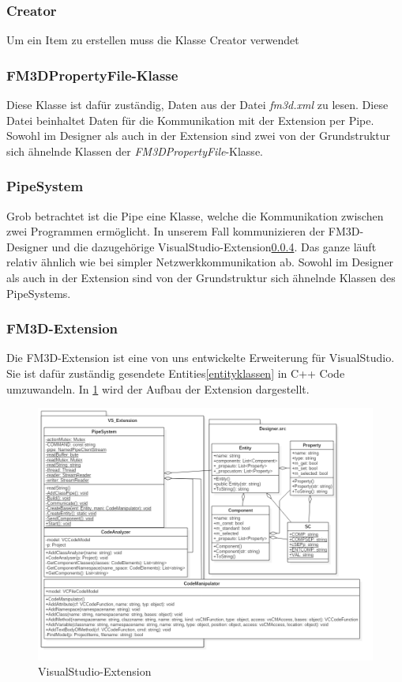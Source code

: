 \subsubsection{Creator}
Um ein Item zu erstellen muss die Klasse Creator verwendet 
\todo[inline]{!!!}
\subsubsection{FM3DPropertyFile-Klasse}
Diese Klasse ist dafür zuständig, Daten aus der Datei \textit{fm3d.xml} zu lesen. Diese Datei beinhaltet Daten für die Kommunikation mit der Extension per Pipe. Sowohl im Designer als auch in der Extension sind zwei von der Grundstruktur sich ähnelnde Klassen der \textit{FM3DPropertyFile}-Klasse.

\subsubsection{PipeSystem} 
\label{pipe}
Grob betrachtet ist die Pipe eine Klasse, welche die Kommunikation zwischen zwei Programmen ermöglicht. In unserem Fall kommunizieren der FM3D-Designer und die dazugehörige VisualStudio-Extension\ref{extension}. Das ganze läuft relativ ähnlich wie bei simpler Netzwerkkommunikation ab. 
Sowohl im Designer als auch in der Extension sind von der Grundstruktur sich ähnelnde Klassen des PipeSystems.

\subsubsection{FM3D-Extension}
\label{extension}
Die FM3D-Extension ist eine von uns entwickelte Erweiterung für VisualStudio. Sie ist dafür zuständig gesendete Entities\ref{entityklassen} in C++ Code umzuwandeln. In \cref{vsextensiondia} wird der Aufbau der Extension dargestellt.
\begin{figure}
	\begin{center}
		\includegraphics[width=\textwidth]{03unserprogramm/Designer/VSExtension.png}
		\caption{VisualStudio-Extension}\label{vsextensiondia}
	\end{center}
\end{figure}